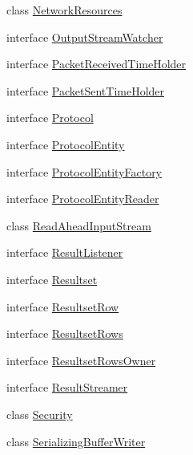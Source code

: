 \begin{DoxyCompactItemize}
\item 
class \mbox{\hyperlink{classcom_1_1mysql_1_1cj_1_1protocol_1_1_network_resources}{Network\+Resources}}
\item 
interface \mbox{\hyperlink{interfacecom_1_1mysql_1_1cj_1_1protocol_1_1_output_stream_watcher}{Output\+Stream\+Watcher}}
\item 
interface \mbox{\hyperlink{interfacecom_1_1mysql_1_1cj_1_1protocol_1_1_packet_received_time_holder}{Packet\+Received\+Time\+Holder}}
\item 
interface \mbox{\hyperlink{interfacecom_1_1mysql_1_1cj_1_1protocol_1_1_packet_sent_time_holder}{Packet\+Sent\+Time\+Holder}}
\item 
interface \mbox{\hyperlink{interfacecom_1_1mysql_1_1cj_1_1protocol_1_1_protocol}{Protocol}}
\item 
interface \mbox{\hyperlink{interfacecom_1_1mysql_1_1cj_1_1protocol_1_1_protocol_entity}{Protocol\+Entity}}
\item 
interface \mbox{\hyperlink{interfacecom_1_1mysql_1_1cj_1_1protocol_1_1_protocol_entity_factory}{Protocol\+Entity\+Factory}}
\item 
interface \mbox{\hyperlink{interfacecom_1_1mysql_1_1cj_1_1protocol_1_1_protocol_entity_reader}{Protocol\+Entity\+Reader}}
\item 
class \mbox{\hyperlink{classcom_1_1mysql_1_1cj_1_1protocol_1_1_read_ahead_input_stream}{Read\+Ahead\+Input\+Stream}}
\item 
interface \mbox{\hyperlink{interfacecom_1_1mysql_1_1cj_1_1protocol_1_1_result_listener}{Result\+Listener}}
\item 
interface \mbox{\hyperlink{interfacecom_1_1mysql_1_1cj_1_1protocol_1_1_resultset}{Resultset}}
\item 
interface \mbox{\hyperlink{interfacecom_1_1mysql_1_1cj_1_1protocol_1_1_resultset_row}{Resultset\+Row}}
\item 
interface \mbox{\hyperlink{interfacecom_1_1mysql_1_1cj_1_1protocol_1_1_resultset_rows}{Resultset\+Rows}}
\item 
interface \mbox{\hyperlink{interfacecom_1_1mysql_1_1cj_1_1protocol_1_1_resultset_rows_owner}{Resultset\+Rows\+Owner}}
\item 
interface \mbox{\hyperlink{interfacecom_1_1mysql_1_1cj_1_1protocol_1_1_result_streamer}{Result\+Streamer}}
\item 
class \mbox{\hyperlink{classcom_1_1mysql_1_1cj_1_1protocol_1_1_security}{Security}}
\item 
class \mbox{\hyperlink{classcom_1_1mysql_1_1cj_1_1protocol_1_1_serializing_buffer_writer}{Serializing\+Buffer\+Writer}}

\end{DoxyCompactItemize}

